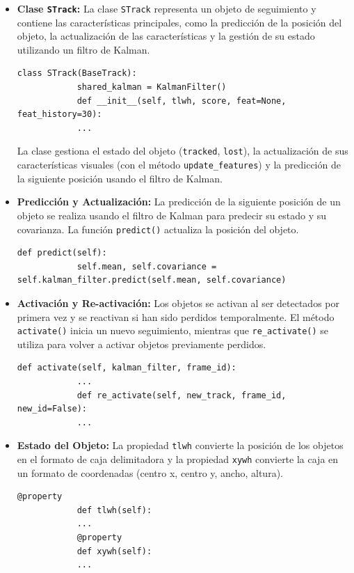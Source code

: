 \documentclass[12pt, a4paper, twoside]{article}
\begin{document}
	\begin{itemize}
		\item \textbf{Clase \texttt{STrack}:}  
		La clase \texttt{STrack} representa un objeto de seguimiento y contiene las características principales, como la predicción de la posición del objeto, la actualización de las características y la gestión de su estado utilizando un filtro de Kalman.
		\vspace{0.5cm}
		\begin{lstlisting}[style=pythonstyle]
			class STrack(BaseTrack):
			shared_kalman = KalmanFilter()
			def __init__(self, tlwh, score, feat=None, feat_history=30):
			...
		\end{lstlisting}
		
		La clase gestiona el estado del objeto (\texttt{tracked}, \texttt{lost}), la actualización de sus características visuales (con el método \texttt{update\_features}) y la predicción de la siguiente posición usando el filtro de Kalman.
		
		\item \textbf{Predicción y Actualización:}  
		La predicción de la siguiente posición de un objeto se realiza usando el filtro de Kalman para predecir su estado y su covarianza. La función \texttt{predict()} actualiza la posición del objeto.
		\vspace{0.5cm}
		\begin{lstlisting}[style=pythonstyle]
			def predict(self):
			self.mean, self.covariance = self.kalman_filter.predict(self.mean, self.covariance)
		\end{lstlisting}
		
		\item \textbf{Activación y Re-activación:}  
		Los objetos se activan al ser detectados por primera vez y se reactivan si han sido perdidos temporalmente. El método \texttt{activate()} inicia un nuevo seguimiento, mientras que \texttt{re\_activate()} se utiliza para volver a activar objetos previamente perdidos.
		\vspace{0.5cm}
		\begin{lstlisting}[style=pythonstyle]
			def activate(self, kalman_filter, frame_id):
			...
			def re_activate(self, new_track, frame_id, new_id=False):
			...
		\end{lstlisting}
		
		\item \textbf{Estado del Objeto:}  
		La propiedad \texttt{tlwh} convierte la posición de los objetos en el formato de caja delimitadora y la propiedad \texttt{xywh} convierte la caja en un formato de coordenadas (centro x, centro y, ancho, altura).
		\vspace{0.5cm}
		\begin{lstlisting}[style=pythonstyle]
			@property
			def tlwh(self):
			...
			@property
			def xywh(self):
			...
		\end{lstlisting}
		

\end{itemize}
\end{document}
